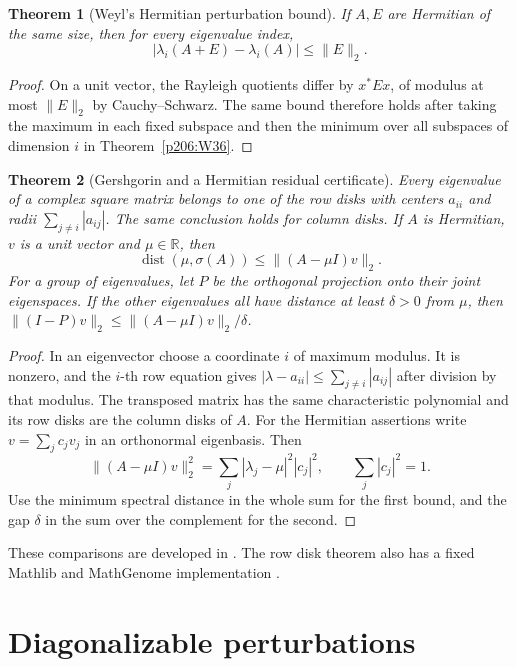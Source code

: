 \documentclass[11pt,oneside,openany]{book}
\theoremstyle{plain}
\newtheorem{theorem}{Theorem}[chapter]
\theoremstyle{definition}
\theoremstyle{remark}
\begin{document}
\begin{theorem}[Weyl's Hermitian perturbation bound]\label{p206:W37}
If \(A,E\) are Hermitian of the same size, then for every
eigenvalue index,
\[
                |\lambda_i(A+E)-\lambda_i(A)|\le\|E\|_2 .
\]
\end{theorem}
\begin{proof}
On a unit vector, the Rayleigh quotients differ by
\(x^*Ex\), of modulus at most \(\|E\|_2\) by Cauchy--Schwarz.
The same bound therefore holds after taking the maximum in each
fixed subspace and then the minimum over all subspaces of
dimension \(i\) in Theorem~\ref{p206:W36}.
\end{proof}

\begin{theorem}[Gershgorin and a Hermitian residual certificate]
\label{p206:W38}
Every eigenvalue of a complex square matrix belongs to one of the
row disks with centers \(a_{ii}\) and radii
\(\sum_{j\ne i}|a_{ij}|\). The same conclusion holds for column
disks. If \(A\) is Hermitian, \(v\) is a unit vector and
\(\mu\in\mathbb R\), then
\[
 \operatorname{dist}(\mu,\sigma(A))\le\|(A-\mu I)v\|_2 .
\]
For a group of eigenvalues, let \(P\) be the orthogonal projection
onto their joint eigenspaces. If the other eigenvalues all have
distance at least \(\delta>0\) from \(\mu\), then
\(\|(I-P)v\|_2\le\|(A-\mu I)v\|_2/\delta\).
\end{theorem}
\begin{proof}
In an eigenvector choose a coordinate \(i\) of maximum modulus.
It is nonzero, and the \(i\)-th row equation gives
\(|\lambda-a_{ii}|\le\sum_{j\ne i}|a_{ij}|\) after division by
that modulus. The transposed matrix has the same characteristic
polynomial and its row disks are the column disks of \(A\).
For the Hermitian assertions write \(v=\sum_j c_j v_j\) in an
orthonormal eigenbasis. Then
\[
 \|(A-\mu I)v\|_2^2=\sum_j|\lambda_j-\mu|^2|c_j|^2,
 \qquad\sum_j|c_j|^2=1.
\]
Use the minimum spectral distance in the whole sum for the first
bound, and the gap \(\delta\) in the sum over the complement for
the second.
\end{proof}
These comparisons are developed in \cite[Sections 7.2 and 8.1--8.2]{golub}.
The row disk theorem also has a fixed Mathlib and MathGenome
implementation \cite{mathlib,d05}.

\section{Diagonalizable perturbations}
\end{document}

